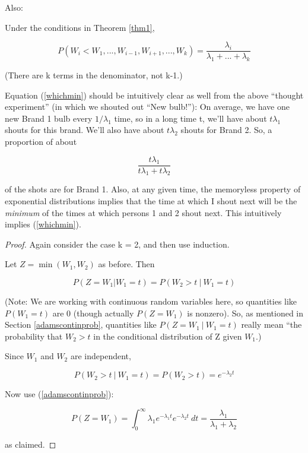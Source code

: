 Also:

\begin{theorem}
Under the conditions in Theorem \ref{thm1}, 

\begin{equation}
\label{whichmin}
P(W_i < W_1,...,W_{i-1}, W_{i+1},...,W_k) =
\frac{\lambda_i}{\lambda_1+...+\lambda_k}
\end{equation}

(There are k terms in the denominator, not k-1.)

\end{theorem}

Equation (\ref{whichmin}) should be intuitively clear as well from the
above ``thought experiment'' (in which we shouted out ``New bulb!''):
On average, we have one new Brand 1 bulb every $1/\lambda_1$ time, so in
a long time t, we'll have about $t \lambda_1$ shouts for this brand.
We'll also have about $t \lambda_2$ shouts for Brand 2.  So, a
proportion of about

\begin{equation}
\frac{t\lambda_1}{t\lambda_1 + t\lambda_2}
\end{equation}

of the shots are for Brand 1.  Also, at any given time, the memoryless
property of exponential distributions implies that the time at which I
shout next will be the {\it minimum} of the times at which persons 1 and
2 shout next.  This intuitively implies (\ref{whichmin}).

\begin{proof}

Again consider the case k = 2, and then use induction.

Let $Z = \min(W_1,W_2)$ as before.  Then

\begin{equation}
P(Z = W_1 | W_1 = t) = P(W_2 > t ~|~ W_1 = t)
\end{equation}

(Note:  We are working with continuous random variables here, so
quantities like $P(W_1 = t)$ are 0 (though actually $P(Z = W_1)$ is
nonzero).  So, as mentioned in Section \ref{adamscontinprob}, quantities
like $P(Z = W_1 ~|~ W_1 = t)$ really mean ``the probability that $W_2 >
t$ in the conditional distribution of Z given $W_1$.) 

Since $W_1$ and $W_2$ are independent, 

\begin{equation}
P(W_2 > t ~|~ W_1 = t) = P(W_2 > t) = e^{-\lambda_2 t}
\end{equation}

Now use (\ref{adamscontinprob}):

\begin{equation}
P(Z = W_1) = \int_{0}^{\infty} \lambda_1 e^{-\lambda_1 t} e^{-\lambda_2 t} ~ dt
= \frac{\lambda_1}{\lambda_1 + \lambda_2}
\end{equation}

as claimed.

\end{proof}

